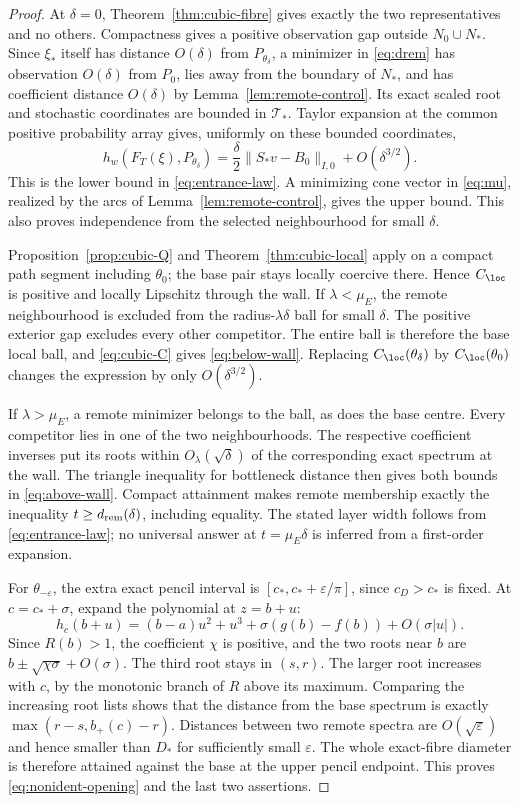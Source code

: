 \begin{proof}
At $\delta=0$, Theorem~\ref{thm:cubic-fibre} gives exactly the two
representatives and no others. Compactness gives a positive observation
gap outside $N_0\cup N_*$. Since $\xi_*$ itself has distance $O(\delta)$
from $P_{\theta_\delta}$, a minimizer in \eqref{eq:drem} has observation
$O(\delta)$ from $P_0$, lies away from the boundary of $N_*$, and has
coefficient distance $O(\delta)$ by Lemma~\ref{lem:remote-control}.
Its exact scaled root and stochastic coordinates are bounded in
$\mathcal T_*$. Taylor expansion at the common positive probability
array gives, uniformly on these bounded coordinates,
\[
 h_w(F_T(\xi),P_{\theta_\delta})
   =\frac\delta2\|S_*v-B_0\|_{I,0}+O(\delta^{3/2}).
\]
This is the lower bound in \eqref{eq:entrance-law}. A minimizing cone
vector in \eqref{eq:mu}, realized by the arcs of
Lemma~\ref{lem:remote-control}, gives the upper bound. This also proves
independence from the selected neighbourhood for small $\delta$.

Proposition~\ref{prop:cubic-Q} and Theorem~\ref{thm:cubic-local} apply
on a compact path segment including $\theta_0$; the base pair stays
locally coercive there. Hence $C_{\loc}$ is positive and locally
Lipschitz through the wall. If $\lambda<\mu_E$, the remote neighbourhood
is excluded from the radius-$\lambda\delta$ ball for small $\delta$.
The positive exterior gap excludes every other competitor. The entire
ball is therefore the base local ball, and \eqref{eq:cubic-C} gives
\eqref{eq:below-wall}. Replacing $C_{\loc}(\theta_\delta)$ by
$C_{\loc}(\theta_0)$ changes the expression by only $O(\delta^{3/2})$.

If $\lambda>\mu_E$, a remote minimizer belongs to the ball, as does
the base centre. Every competitor lies in one of the two neighbourhoods.
The respective coefficient inverses put its roots within $O_\lambda(\sqrt
\delta)$ of the corresponding exact spectrum at the wall. The triangle
inequality for bottleneck distance then gives both bounds in
\eqref{eq:above-wall}. Compact attainment makes remote membership
exactly the inequality $t\ge d_{\rm rem}(\delta)$, including equality.
The stated layer width follows from \eqref{eq:entrance-law}; no universal
answer at $t=\mu_E\delta$ is inferred from a first-order expansion.

For $\theta_{-\varepsilon}$, the extra exact pencil interval is
$[c_*,c_*+\varepsilon/\pi]$, since $c_D>c_*$ is fixed. At
$c=c_*+\sigma$, expand the polynomial at $z=b+u$:
\[
 h_c(b+u)=(b-a)u^2+u^3+\sigma(g(b)-f(b))+O(\sigma|u|).
\]
Since $R(b)>1$, the coefficient $\chi$ is positive, and the two
roots near $b$ are $b\pm\sqrt{\chi\sigma}+O(\sigma)$. The third
root stays in $(s,r)$. The larger root increases with $c$, by the
monotonic branch of $R$ above its maximum. Comparing the increasing
root lists shows that the distance from the base spectrum is exactly
$\max(r-s,b_+(c)-r)$. Distances between two remote spectra are
$O(\sqrt\varepsilon)$ and hence smaller than $D_*$ for sufficiently
small $\varepsilon$. The whole exact-fibre diameter is therefore
attained against the base at the upper pencil endpoint. This proves
\eqref{eq:nonident-opening} and the last two assertions.
\end{proof}

